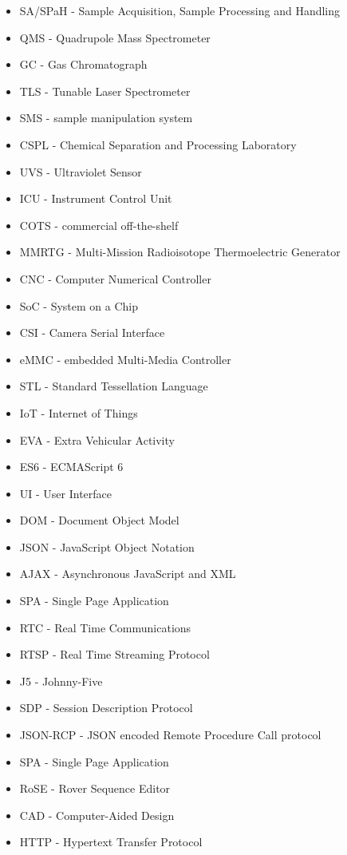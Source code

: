 \begin{itemize}
\item SA/SPaH - Sample Acquisition, Sample Processing and Handling
\item QMS - Quadrupole Mass Spectrometer
\item GC - Gas Chromatograph
\item TLS - Tunable Laser Spectrometer
\item SMS - sample manipulation system
\item CSPL - Chemical Separation and Processing Laboratory
\item UVS - Ultraviolet Sensor
\item ICU - Instrument Control Unit
\item COTS - commercial off-the-shelf
\item MMRTG - Multi-Mission Radioisotope Thermoelectric Generator
\item CNC - Computer Numerical Controller
\item SoC - System on a Chip
\item CSI - Camera Serial Interface
\item eMMC - embedded Multi-Media Controller
\item STL - Standard Tessellation Language
\item IoT - Internet of Things
\item EVA - Extra Vehicular Activity
\item ES6 - ECMAScript 6
\item UI - User Interface
\item DOM - Document Object Model
\item JSON - JavaScript Object Notation
\item AJAX - Asynchronous JavaScript and XML
\item SPA - Single Page Application
\item RTC - Real Time Communications
\item RTSP - Real Time Streaming Protocol
\item J5 - Johnny-Five
\item SDP - Session Description Protocol
\item JSON-RCP - JSON encoded Remote Procedure Call protocol
\item SPA - Single Page Application
\item RoSE - Rover Sequence Editor
\item CAD - Computer-Aided Design
\item HTTP - Hypertext Transfer Protocol
\end{itemize}
